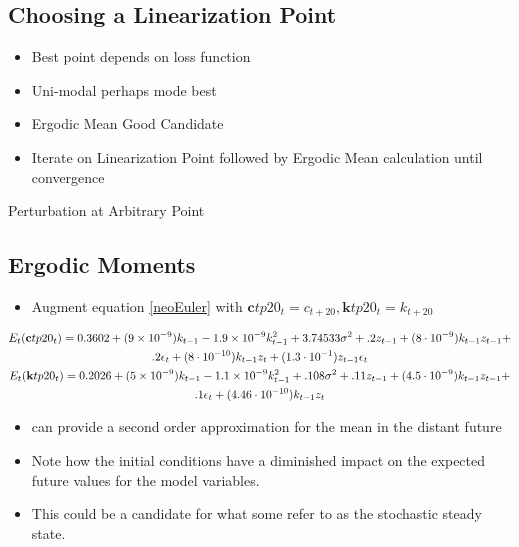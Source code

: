 \documentclass[12pt]{article}
\begin{document}
\subsection{Choosing a Linearization Point}
  \begin{itemize}
  \item Best point depends on loss function
  \item Uni-modal perhaps mode best
  \item Ergodic Mean Good Candidate
  \item Iterate on Linearization Point followed by Ergodic Mean calculation until convergence
  \end{itemize}

{Perturbation at Arbitrary Point}
{\small
{}
}


\subsection{Ergodic  Moments}
\label{sec:impulse-resp-funct}

  \begin{itemize}
   \item Augment equation \ref{neoEuler} with $\mathbf{c}tp20_t = c_{t+20}, \mathbf{k}tp20_t = k_{t+20}$
    \end{itemize}
{\tiny
 \begin{gather*} 
E_t(     \mathbf{c}tp20_t)= 0.3602 + (9 \times  10^{-9}) k_{t-1} -1.9 \times 10^{-9} k_{t-1}^2 + 3.74533 \sigma^2 + .2 z_{t-1} +(8 \cdot 10^{-9}) k_{t-1} z_{t-1} +\\
 .2 \epsilon_t  +(8 \cdot 10^{-10}) k_{t-1} z_t + (1.3 \cdot 10^{-1}) z_{t-1} \epsilon_t\\
E_t(       \mathbf{k}tp20_t) = 0.2026 + (5 \times  10^{-9}) k_{t-1} -1.1 \times 10^{-9} k_{t-1}^2 + .108 \sigma^2 + .11 z_{t-1} +(4.5 \cdot 10^{-9}) k_{t-1} z_{t-1} +\\
 .1 \epsilon_t  +(4.46 \cdot 10^{-10}) k_{t-1} z_t 
 \end{gather*}
}
    \begin{itemize}
  \item can provide a second order approximation for the
mean in the distant future
 \item Note how the initial conditions have a diminished 
 impact on the expected future
 values for the model variables.
\item This could be a candidate for what
some refer to as the stochastic steady state.


   \end{itemize}
\end{document}
